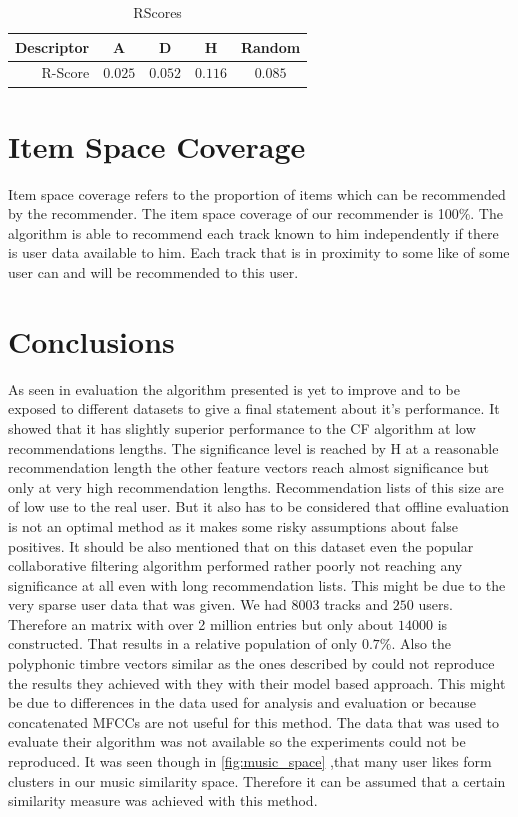 \documentclass[cic,tc,english]{iiufrgs}
\begin{document}
\begin{table}
\center
\caption{RScores}
\begin{tabular}{ r | c | c | c | c | }

\rowcolor{lightgray} Descriptor & A & D & H & Random \\ \hline
R-Score & $0.025$ & $0.052$ & $\bm{0.116}$ & $0.085$   \\

\end{tabular}
\label{tab:rscores}
\end{table}


\section{Item Space Coverage}
Item space coverage refers to the proportion of items which can be recommended by the recommender. The item space coverage of our recommender is 100\%. The algorithm is able to recommend each track known to him independently if there is user data available to him. Each track that is in proximity to some like of some user can and will be recommended to this user.

\section{Conclusions}
As seen in evaluation the algorithm presented is yet to improve and to be exposed to different datasets to give a final statement about it's performance. It showed that it has slightly superior performance to the CF algorithm at low recommendations lengths. The significance level is reached by H at a reasonable recommendation length the other feature vectors reach almost significance but only at very high recommendation lengths. Recommendation lists of this size are of low use to the real user. But it also has to be considered that offline evaluation is not an optimal method as it makes some risky assumptions about false positives. It should be also mentioned that on this dataset even the popular collaborative filtering algorithm performed rather poorly not reaching any significance at all even with long recommendation lists. This might be due to the very sparse user data that was given. We had $8003$ tracks and $250$ users. Therefore an matrix with over 2 million entries but only about $14000$ is constructed. That results in a relative population of only $0.7\%$. Also the polyphonic timbre vectors similar as the ones described by \cite{yoshii2008efficient} could not reproduce the results they achieved with they with their model based approach. This might be due to differences in the data used for analysis and evaluation or because concatenated MFCCs are not useful for this method. The data that was used to evaluate their algorithm was not available so the experiments could not be reproduced. It was seen though in \ref{fig:music_space} ,that many user likes form clusters in our music similarity space. Therefore it can be assumed that a certain similarity measure was achieved with this method.
\end{document}
